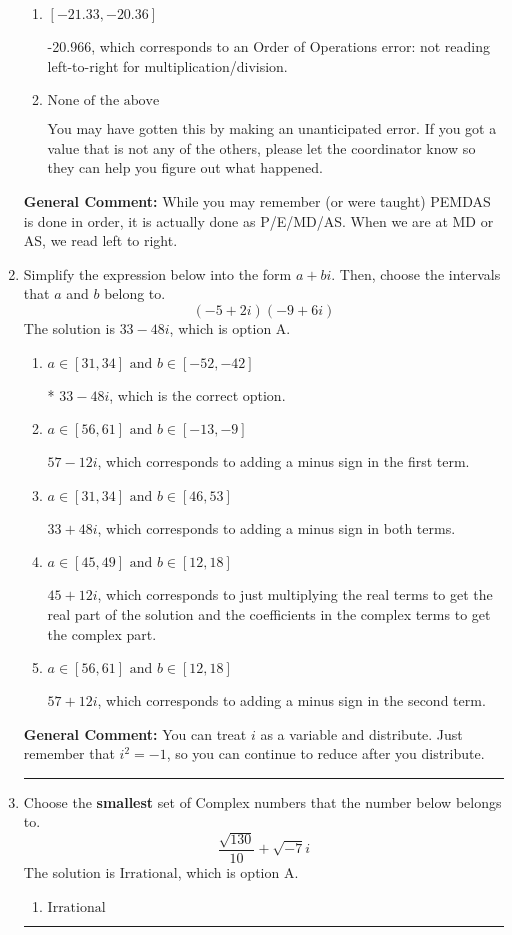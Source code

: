 \documentclass{extbook}[14pt]
\newcommand{\litem}[1]{\item #1

\rule{\textwidth}{0.4pt}}
\begin{document}
\begin{enumerate}
{\begin{enumerate}[label=\Alph*.]
 51.034, which corresponds to two Order of Operations errors.
\item \( [-21.33, -20.36] \)

 -20.966, which corresponds to an Order of Operations error: not reading left-to-right for multiplication/division.
\item \( \text{None of the above} \)

 You may have gotten this by making an unanticipated error. If you got a value that is not any of the others, please let the coordinator know so they can help you figure out what happened.
\end{enumerate}

\textbf{General Comment:} While you may remember (or were taught) PEMDAS is done in order, it is actually done as P/E/MD/AS. When we are at MD or AS, we read left to right.
}
\litem{
Simplify the expression below into the form $a+bi$. Then, choose the intervals that $a$ and $b$ belong to.
\[ (-5 + 2 i)(-9 + 6 i) \]The solution is \( 33 - 48 i \), which is option A.\begin{enumerate}[label=\Alph*.]
\item \( a \in [31, 34] \text{ and } b \in [-52, -42] \)

* $33 - 48 i$, which is the correct option.
\item \( a \in [56, 61] \text{ and } b \in [-13, -9] \)

 $57 - 12 i$, which corresponds to adding a minus sign in the first term.
\item \( a \in [31, 34] \text{ and } b \in [46, 53] \)

 $33 + 48 i$, which corresponds to adding a minus sign in both terms.
\item \( a \in [45, 49] \text{ and } b \in [12, 18] \)

 $45 + 12 i$, which corresponds to just multiplying the real terms to get the real part of the solution and the coefficients in the complex terms to get the complex part.
\item \( a \in [56, 61] \text{ and } b \in [12, 18] \)

 $57 + 12 i$, which corresponds to adding a minus sign in the second term.
\end{enumerate}

\textbf{General Comment:} You can treat $i$ as a variable and distribute. Just remember that $i^2=-1$, so you can continue to reduce after you distribute.
}
\litem{
Choose the \textbf{smallest} set of Complex numbers that the number below belongs to.
\[ \frac{\sqrt{130}}{10}+\sqrt{-7}i \]The solution is \( \text{Irrational} \), which is option A.\begin{enumerate}[label=\Alph*.]
\item \( \text{Irrational} \)


\end{enumerate}}
\end{enumerate}
\end{document}
